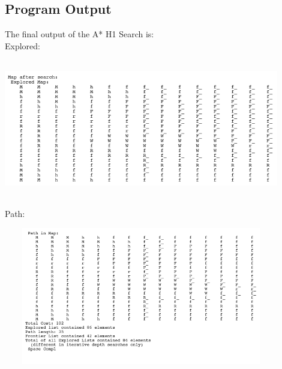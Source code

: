 \documentclass[12pt]{article}
\begin{document}
	\subsection{Program Output}
	The final output of the A* H1 Search is:
	\\
	Explored:
	\begin{center}
		\includegraphics[width=120mm,height=60mm]{images/ah1/final_map_explored.png}
	\end{center}
	Path:
	\begin{center}
		\includegraphics[width=120mm,height=60mm]{images/ah1/final_map_path.png}
	\end{center}

	\pagebreak
\end{document}
